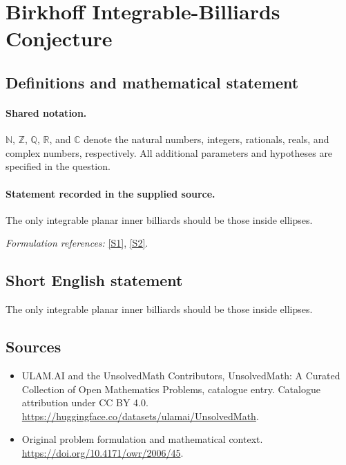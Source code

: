 \documentclass[11pt]{article}
\newcommand{\sref}[2]{\hyperlink{source:#1:#2}{[S#2]}}
\begin{document}
\section{Birkhoff Integrable-Billiards Conjecture}\label{statement}

\subsection{Definitions and mathematical statement}

\paragraph{Shared notation.}$\mathbb N$, $\mathbb Z$, $\mathbb Q$, $\mathbb R$, and $\mathbb C$ denote the natural numbers, integers, rationals, reals, and complex numbers, respectively. All additional parameters and hypotheses are specified in the question.


\paragraph{Statement recorded in the supplied source.}
The only integrable planar inner billiards should be those inside ellipses.
\par\smallskip\textit{Formulation references:} \sref{statement}{1}, \sref{statement}{2}.
\subsection{Short English statement}
The only integrable planar inner billiards should be those inside ellipses.
\subsection{Sources}
\begin{itemize}
\item[\hypertarget{source:statement:1}{S1}] ULAM.AI and the UnsolvedMath Contributors, UnsolvedMath: A Curated Collection of Open Mathematics Problems, catalogue entry. Catalogue attribution under CC BY 4.0.
\url{https://huggingface.co/datasets/ulamai/UnsolvedMath}.
\item[\hypertarget{source:statement:2}{S2}] Original problem formulation and mathematical context.
\url{https://doi.org/10.4171/owr/2006/45}.
\end{itemize}
\label{end:statement}
\end{document}
